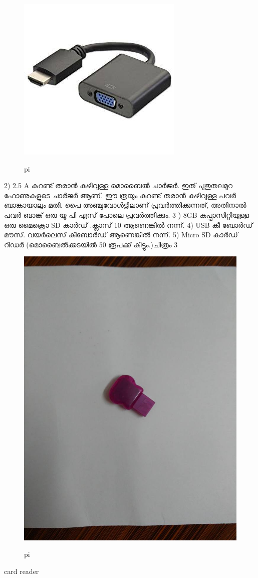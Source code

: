 \documentclass[10pt,a4paper]{report}
\begin{document}
 \begin{figure}[H]
  \center
\includegraphics[scale=.25]{images/pi2}
\label{pi2}
\caption{    pi}
\end{figure}


2) 2.5 A കറണ്ട് തരാൻ കഴിവുള്ള മൊബൈൽ ചാർജർ. ഇത് പുതുതലമുറ ഫോണുകളുടെ ചാർജർ ആണ്. ഈ ത്രയും കറണ്ട് തരാൻ കഴിവുള്ള പവർ ബാങ്കായാലും മതി. പൈ അഞ്ചുവോൾട്ടിലാണ് പ്രവർത്തിക്കുന്നത്, അതിനാൽ പവർ ബാങ്ക് ഒരു യൂ പി എസ് പോലെ പ്രവർത്തിക്കും. 
3 ) 8GB കപ്പാസിറ്റിയുള്ള ഒരു മൈക്രൊ SD കാർഡ് .ക്ലാസ് 10 ആണെങ്കിൽ നന്ന്.
4) USB കീ ബോർഡ് മൗസ്. വയർലെസ് കീബോർഡ് ആണെങ്കിൽ നന്ന്.
5) Micro SD കാർഡ് റിഡർ (മൊബൈൽക്കടയിൽ 50 രൂപക്ക് കിട്ടും.)ചിത്രം 3

 \begin{figure}[H]
  \center
\includegraphics[scale=.25]{images/pi3}
\label{pi3}
\caption{    pi}
\end{figure}
card reader
\end{document}
